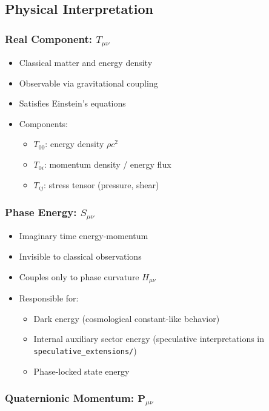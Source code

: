 \subsection{Physical Interpretation}

\subsubsection{Real Component: $T_{\mu\nu}$}

\begin{itemize}
    \item Classical matter and energy density
    \item Observable via gravitational coupling
    \item Satisfies Einstein's equations
    \item Components:
    \begin{itemize}
        \item $T_{00}$: energy density $\rho c^2$
        \item $T_{0i}$: momentum density / energy flux
        \item $T_{ij}$: stress tensor (pressure, shear)
    \end{itemize}
\end{itemize}

\subsubsection{Phase Energy: $S_{\mu\nu}$}

\begin{itemize}
    \item Imaginary time energy-momentum
    \item Invisible to classical observations
    \item Couples only to phase curvature $H_{\mu\nu}$
    \item Responsible for:
    \begin{itemize}
        \item Dark energy (cosmological constant-like behavior)
        \item Internal auxiliary sector energy (speculative interpretations in \texttt{speculative\_extensions/})
        \item Phase-locked state energy
    \end{itemize}
\end{itemize}

\subsubsection{Quaternionic Momentum: $\mathbf{P}_{\mu\nu}$}

